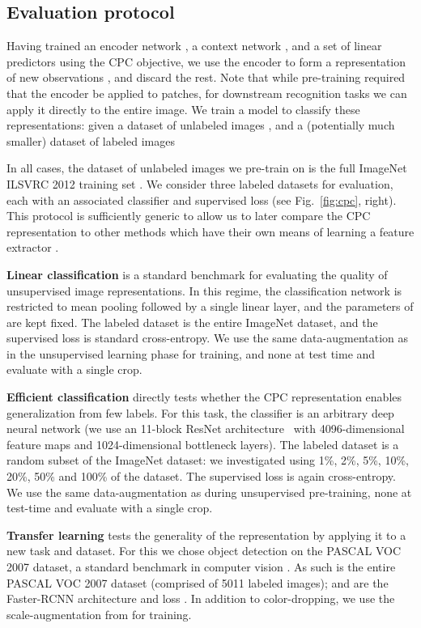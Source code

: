 \documentclass{article}
\begin{document}
\subsection{Evaluation protocol}
\label{sec:evaluation-protocol}

Having trained an encoder network , a context network , and a set of linear predictors  using the CPC objective, we use the encoder to form a representation  of new observations , and discard the rest. Note that while pre-training required that the encoder be applied to patches, for downstream recognition tasks we can apply it directly to the entire image. We train a model  to classify these representations: given a dataset of  unlabeled images , and a (potentially much smaller) dataset of  labeled images 

In all cases, the dataset of unlabeled images  we pre-train on is the full ImageNet ILSVRC 2012 training set \citep{russakovsky2015imagenet}. We consider three labeled datasets  for evaluation, each with an associated classifier  and supervised loss  (see Fig.\ \ref{fig:cpc}, right). This protocol is sufficiently generic to allow us to later compare the CPC representation to other methods which have their own means of learning a feature extractor . 

\textbf{Linear classification} is a standard benchmark for evaluating the quality of unsupervised image representations. In this regime, the classification network  is restricted to mean pooling followed by a single linear layer, and the parameters of  are kept fixed. The labeled dataset  is the entire ImageNet dataset, and the supervised loss  is standard cross-entropy. We use the same data-augmentation as in the unsupervised learning phase for training, and none at test time and evaluate with a single crop.

\textbf{Efficient classification} directly tests whether the CPC representation enables generalization from few labels. For this task, the classifier  is an arbitrary deep neural network (we use an 11-block ResNet architecture~\citep{he2016deep} with 4096-dimensional feature maps and 1024-dimensional bottleneck layers). The labeled dataset  is a random subset of the ImageNet dataset: we investigated using 1\%, 2\%, 5\%, 10\%, 20\%, 50\% and 100\% of the dataset. The supervised loss  is again cross-entropy. We use the same data-augmentation as during unsupervised pre-training, none at test-time and evaluate with a single crop.

\textbf{Transfer learning} tests the generality of the representation by applying it to a new task and dataset. For this we chose object detection on the PASCAL VOC 2007 dataset, a standard benchmark in computer vision \citep{everingham2007pascal}. As such  is the entire PASCAL VOC 2007 dataset (comprised of 5011 labeled images);  and  are the Faster-RCNN architecture and loss \citep{ren2015faster}. In addition to color-dropping, we use the  scale-augmentation from \citet{doersch2015unsupervised} for training.
\end{document}

